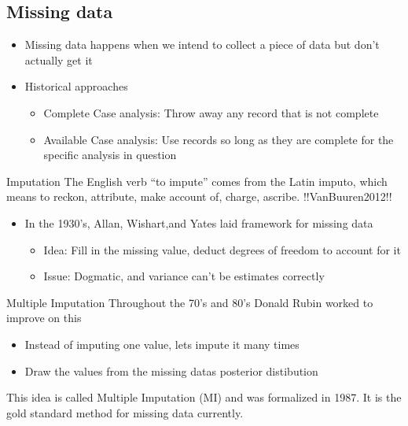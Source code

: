 \documentclass{beamer}
\begin{document}
\subsection{Missing data}
\begin{frame}
 \begin{itemize}
 \item Missing data happens when we intend to collect a piece of data but don't actually get it
 \item Historical approaches
 \begin{itemize}
  \item Complete Case analysis: Throw away any record that is not complete
 \item Available Case analysis: Use records so long as they are complete for the specific analysis in question
 \end{itemize}
 \end{itemize}
\end{frame}


\begin{frame}{Imputation}
The English verb ``to impute'' comes from the Latin imputo, which means
to reckon, attribute, make account of, charge, ascribe. !!VanBuuren2012!!
\begin{itemize}
 \item In the 1930's, Allan, Wishart,and Yates laid framework for missing data
 \begin{itemize}
  \item Idea: Fill in the missing value, deduct degrees of freedom to account for it
  \item Issue: Dogmatic, and variance can't be estimates correctly
 \end{itemize}

\end{itemize}

 
\end{frame}

\begin{frame}{Multiple Imputation}
Throughout the 70's and 80's Donald Rubin worked to improve on this
\begin{itemize}
 \item Instead of imputing one value, lets impute it many times
 \item Draw the values from the missing datas posterior distibution
\end{itemize}
This idea is called Multiple Imputation (MI) and was formalized in 1987. It is the gold standard method
for missing data currently.
 
\end{frame}
\end{document}
